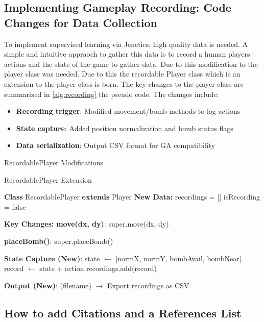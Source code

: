 \documentclass[sigconf]{acmart} %
\begin{document}
\subsection{Implementing Gameplay Recording: Code Changes for Data Collection}
To implement supervised learning via Jenetics, high quality data is needed. A simple and intuitive appraoch to gather this data is to record a human players actions and the state of the game to gather data. Due to this modification to the player class was needed. Due to this the recordable Player class which is an extension to the player class is born. The key changes to the player class are summarized in \ref{alg:recording} the pseudo code. The changes include: 
\begin{itemize}
    \item \textbf{Recording trigger}: Modified movement/bomb methods to log actions
    \item \textbf{State capture}: Added position normalization and bomb status flags
    \item \textbf{Data serialization}: Output CSV format for GA compatibility
\end{itemize}
\begin{algorithm}[t]
\caption{RecordablePlayer Modifications}
\label{alg:recording}
\DontPrintSemicolon
{}

\caption{RecordablePlayer Extension}
\textbf{Class} RecordablePlayer \textbf{extends} Player\;
\nl\textbf{New Data:} 
    recordings = [] 
    isRecording = false 

\BlankLine
\nl\textbf{Key Changes:}\;
\nl \textbf{move(dx, dy)}:
    super.move(dx, dy)\;

\nl \textbf{placeBomb()}:
    super.placeBomb()\;

\nl\textbf{State Capture (New)}:
    state $\leftarrow$ [normX, normY, bombAvail, bombNear] 
    record $\leftarrow$ state + action 
    recordings.add(record) 

\nl\textbf{Output (New)}:
    \Save(filename) $\rightarrow$ Export recordings as CSV\;
\end{algorithm}

\subsection{How to add Citations and a References List}
\end{document}
